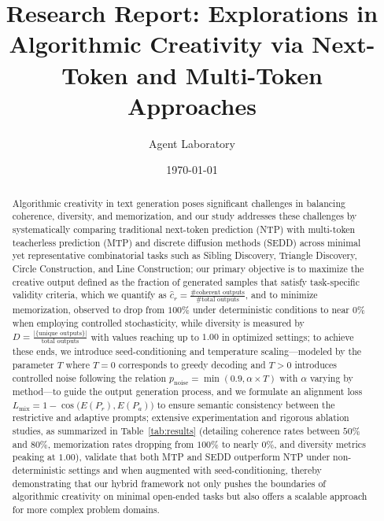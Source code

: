 \documentclass[11pt]{article}
\title{Research Report: Explorations in Algorithmic Creativity via Next-Token and Multi-Token Approaches}
\author{Agent Laboratory}
\date{\today}
\begin{document}
\maketitle

\begin{abstract}
Algorithmic creativity in text generation poses significant challenges in balancing coherence, diversity, and memorization, and our study addresses these challenges by systematically comparing traditional next-token prediction (NTP) with multi-token teacherless prediction (MTP) and discrete diffusion methods (SEDD) across minimal yet representative combinatorial tasks such as Sibling Discovery, Triangle Discovery, Circle Construction, and Line Construction; our primary objective is to maximize the creative output defined as the fraction of generated samples that satisfy task-specific validity criteria, which we quantify as \(\hat{c}_r = \frac{\# \text{coherent outputs}}{\# \text{total outputs}}\), and to minimize memorization, observed to drop from \(100\%\) under deterministic conditions to near \(0\%\) when employing controlled stochasticity, while diversity is measured by \(D = \frac{|\{ \text{unique outputs} \}|}{\text{total outputs}}\) with values reaching up to \(1.00\) in optimized settings; to achieve these ends, we introduce seed-conditioning and temperature scaling—modeled by the parameter \(T\) where \(T=0\) corresponds to greedy decoding and \(T>0\) introduces controlled noise following the relation \(p_{\text{noise}} = \min(0.9, \alpha \times T)\) with \(\alpha\) varying by method—to guide the output generation process, and we formulate an alignment loss \(L_{\text{mix}} = 1 - \cos\Big(E(P_r), E(P_a)\Big)\) to ensure semantic consistency between the restrictive and adaptive prompts; extensive experimentation and rigorous ablation studies, as summarized in Table~\ref{tab:results} (detailing coherence rates between \(50\%\) and \(80\%\), memorization rates dropping from \(100\%\) to nearly \(0\%\), and diversity metrics peaking at \(1.00\)), validate that both MTP and SEDD outperform NTP under non-deterministic settings and when augmented with seed-conditioning, thereby demonstrating that our hybrid framework not only pushes the boundaries of algorithmic creativity on minimal open-ended tasks but also offers a scalable approach for more complex problem domains.
\end{abstract}
\end{document}
